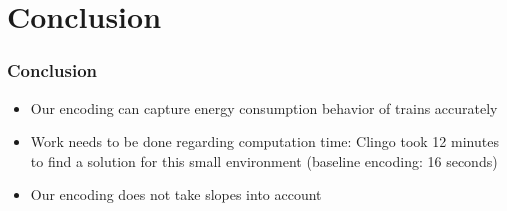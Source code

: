 \documentclass{beamer}
\begin{document}
\section{Conclusion}
\begin{frame}
\frametitle{Conclusion}
\begin{itemize}
  \item Our encoding can capture energy consumption behavior of trains accurately 
  \item Work needs to be done regarding computation time: Clingo took 12 minutes to find a solution for this small environment (baseline encoding: 16 seconds)
  \item Our encoding does not take slopes into account
\end{itemize}
\end{frame}
\end{document}
